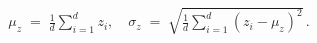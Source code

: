 \documentclass[preview]{standalone}
\begin{document}
\begin{align*}
\mu_z \;=\; \frac{1}{d}\sum_{i=1}^{d}z_i,\quad \sigma_z \;=\;\sqrt{\frac{1}{d}\sum_{i=1}^{d}(z_i - \mu_z)^2}\,.
\end{align*}
\end{document}
